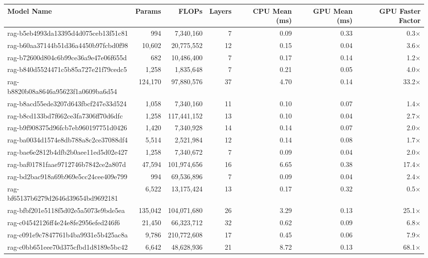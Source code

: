 \begin{table}[h!]
\centering
\fontsize{7}{9}\selectfont
\begin{tabular}{lrrrrrr}
\toprule
\textbf{Model Name} & \textbf{Params} & \textbf{FLOPs} & \textbf{Layers} & \textbf{CPU Mean (ms)} & \textbf{GPU Mean (ms)} & \textbf{GPU Faster Factor} \\
\midrule
rag-b5eb4993da13395d4d075ceb13f51c81 & 994 & 7,340,160 & 7 & 0.09 & 0.33 & 0.3$\times$ \\
rag-b60aa37144b51d36a4450b97fcbd0f98 & 10,602 & 20,775,552 & 12 & 0.15 & 0.04 & 3.6$\times$ \\
rag-b72600d804c6b99ce36a9e47e06f655d & 682 & 10,486,400 & 7 & 0.17 & 0.14 & 1.2$\times$ \\
rag-b840d5524471c5b85a727e21f79cedc5 & 1,258 & 1,835,648 & 7 & 0.21 & 0.05 & 4.0$\times$ \\
rag-b8820b08a8646a95623f1a0609ba6d54 & 124,170 & 97,880,576 & 37 & 4.70 & 0.14 & 33.2$\times$ \\
rag-b8acd55ede3207d643fbcf247e33d524 & 1,058 & 7,340,160 & 11 & 0.10 & 0.07 & 1.4$\times$ \\
rag-b8cd133bd7f662ce3fa7306ff70d6dfc & 1,258 & 117,441,152 & 13 & 0.10 & 0.04 & 2.7$\times$ \\
rag-b9f908375d96fcb7eb960197751d0426 & 1,420 & 7,340,928 & 14 & 0.14 & 0.07 & 2.0$\times$ \\
rag-ba0034d1574e8db788a8c2ce37088df4 & 5,514 & 2,521,984 & 12 & 0.14 & 0.08 & 1.7$\times$ \\
rag-bae6e2812b4dfb2b0aee11ed5d02e427 & 1,258 & 7,340,672 & 7 & 0.09 & 0.04 & 2.0$\times$ \\
rag-baf01781faae9712746b7842ce2a807d & 47,594 & 101,974,656 & 16 & 6.65 & 0.38 & 17.4$\times$ \\
rag-bd2bac918a69b969e5cc24cee409e799 & 994 & 69,536,896 & 7 & 0.09 & 0.04 & 2.4$\times$ \\
rag-bf65137b6279d2646d39654bd9692181 & 6,522 & 13,175,424 & 13 & 0.17 & 0.32 & 0.5$\times$ \\
rag-bfbf201e5118f5d02e5a5073e9bde5ea & 135,042 & 104,071,680 & 26 & 3.29 & 0.13 & 25.1$\times$ \\
rag-c04542126ff4e24e8fe2956efed246f6 & 21,450 & 66,323,712 & 32 & 0.62 & 0.09 & 6.8$\times$ \\
rag-c091e9c7847761b4ba9931e5b425ac8a & 9,786 & 210,772,608 & 17 & 0.45 & 0.06 & 7.9$\times$ \\
rag-c0bb651eee70d375cfbd1d8189e5bc42 & 6,642 & 48,628,936 & 21 & 8.72 & 0.13 & 68.1$\times$ \\

\end{tabular}
\end{table}
